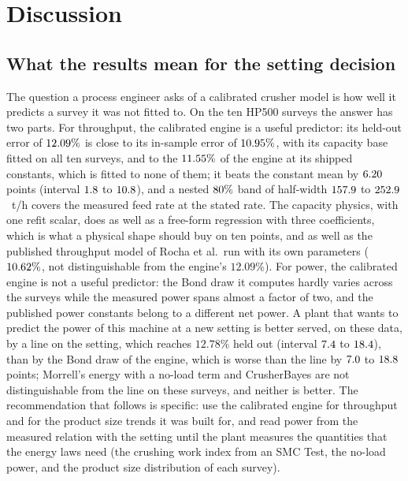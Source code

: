 \section{Discussion}\label{sec:discussion}

\subsection{What the results mean for the setting decision}\label{sec:disc-meaning}

The question a process engineer asks of a calibrated crusher model is how well it predicts a survey it was not fitted to. On the ten HP500 surveys
the answer has two parts. For throughput, the calibrated engine is a useful predictor: its held-out error of $12.09\%$ is close to its
in-sample error of $10.95\%$, with its capacity base fitted on all ten surveys, and to the $11.55\%$ of the engine at its shipped
constants, which is fitted to none of them; it beats the constant mean by $6.20$ points (interval $1.8$ to $10.8$),
and a nested $80\%$ band of half-width $157.9$ to $252.9$~t/h covers the measured feed rate at the stated rate. The capacity physics, with one refit scalar, does as well as a free-form regression with three
coefficients, which is what a physical shape should buy on ten points, and as well as the published throughput model of Rocha et al.\ run with
its own parameters ($10.62\%$, not distinguishable from the engine's $12.09\%$). For power, the calibrated engine is not a useful predictor: the Bond draw it computes hardly varies across the
surveys while the measured power spans almost a factor of two, and the published power constants belong to a different net power. A plant that
wants to predict the power of this machine at a new setting is better served, on these data, by a line on the setting, which reaches $12.78\%$ held
out (interval $7.4$ to $18.4$), than by the Bond draw of the engine, which is worse than the line by $7.0$ to $18.8$
points; Morrell's energy with a no-load term and CrusherBayes are not distinguishable from the line on these surveys, and neither is better. The recommendation that follows is specific: use the calibrated engine for
throughput and for the product size trends it was built for, and read power from the measured relation with the setting until the plant measures
the quantities that the energy laws need (the crushing work index from an SMC Test, the no-load power, and the product size distribution of each
survey).

